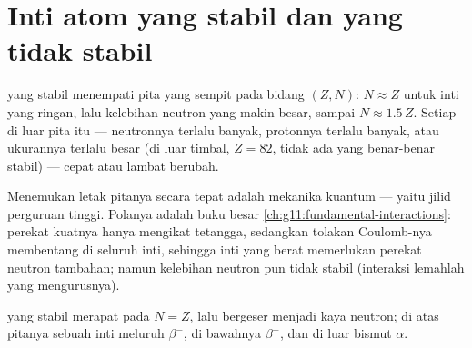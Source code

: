 \section{Inti atom yang stabil dan yang tidak stabil}

\begin{proposition}\label{prop:g11:nucleus-radioactivity:valley}
 yang stabil menempati pita yang sempit pada bidang $(Z, N)$:
$N \approx Z$ untuk inti yang ringan, lalu kelebihan neutron yang makin
besar, sampai $N \approx 1.5\,Z$. Setiap  di luar pita itu ---
neutronnya terlalu banyak, protonnya terlalu banyak, atau ukurannya terlalu
besar (di luar timbal, $Z = 82$, tidak ada  yang benar-benar stabil)
--- cepat atau lambat berubah.
\end{proposition}
\admitted

\begin{remark}
Menemukan letak pitanya secara tepat adalah mekanika kuantum --- yaitu jilid
perguruan tinggi. Polanya adalah buku besar
\cref{ch:g11:fundamental-interactions}: perekat kuatnya hanya mengikat
tetangga, sedangkan tolakan Coulomb-nya membentang di seluruh inti, sehingga
inti yang berat memerlukan perekat neutron tambahan; namun kelebihan neutron
pun tidak stabil (interaksi lemahlah yang mengurusnya).
\end{remark}

\begin{omfigure}

{\small {} yang stabil merapat pada $N = Z$, lalu bergeser menjadi kaya
neutron; di atas pitanya sebuah inti meluruh $\beta^-$, di bawahnya
$\beta^+$, dan di luar bismut $\alpha$.}
\end{omfigure}

